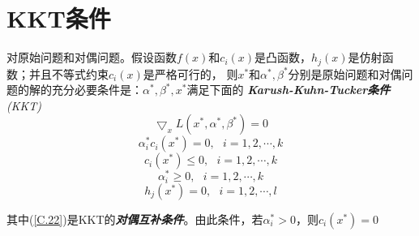 \section{KKT条件}
\begin{theorem}
    对原始问题和对偶问题。假设函数$f(x)$和$c_i(x)$是凸函数，$h_j(x)$是仿射函数；并且不等式约束$c_i(x)$是严格可行的，
    则$x^*$和$\alpha^*,\beta^*$分别是原始问题和对偶问题的解的充分必要条件是：$\alpha^*,\beta^*,x^*$满足下面的
    \textsl{\textbf{Karush-Kuhn-Tucker条件}(KKT)}
    \begin{equation}
        \bigtriangledown_x L(x^*,\alpha^*,\beta^*)=0
    \end{equation}
    \begin{equation}
        \alpha^*_ic_i(x^*)=0,\ \ \ i=1,2,\cdots,k
        \label{C.22}
    \end{equation}
    \begin{equation}
        c_i(x^*)\leqslant 0,\ \ \ i=1,2,\cdots,k
    \end{equation}
    \begin{equation}
        \alpha^*_i\geqslant 0,\ \ \ i=1,2,\cdots,k
    \end{equation}
    \begin{equation}
        h_j(x^*)=0,\ \ \ i=1,2,\cdots,l
    \end{equation}
\end{theorem}

其中(\ref{C.22})是KKT的\textsl{\textbf{对偶互补条件}}。由此条件，若$\alpha^*_i>0$，则$c_i(x^*)=0$

